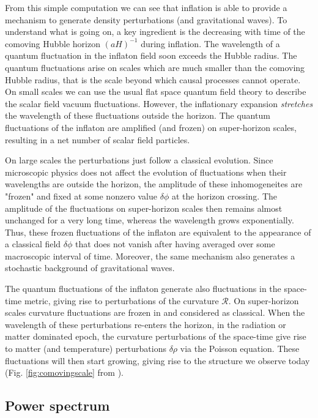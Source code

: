 \documentclass[11pt,a4paper,twoside]{book}
\begin{document}
From this simple computation we can see that inflation is able to provide a mechanism to generate density perturbations (and gravitational waves). To understand what is going on, a key ingredient is the decreasing with time of the comoving Hubble horizon $ (aH)^{-1} $ during inflation. The wavelength of a quantum fluctuation in the inflaton field soon exceeds the Hubble radius. The quantum fluctuations arise on scales which are much smaller than the comoving Hubble radius, that is the scale beyond which causal processes cannot operate. On small scales we can use the usual flat space quantum field theory to describe the scalar field vacuum fluctuations.
However, the inflationary expansion \textit{stretches} the wavelength of these fluctuations  outside the horizon. The quantum fluctuations of the inflaton are amplified (and frozen) on super-horizon scales, resulting in a net number of scalar field particles.

On large scales the perturbations just follow a classical evolution. Since microscopic physics does not affect the evolution of fluctuations when their wavelengths are outside the horizon, the amplitude of these inhomogeneites are "frozen" and fixed at some nonzero value $ \delta\phi $ at the horizon crossing.
The amplitude of the fluctuations on super-horizon scales then remains almost unchanged for a very long time, whereas the wavelength grows exponentially. Thus, these frozen fluctuations of the inflaton are equivalent to the appearance of a classical field $ \delta\phi $ that does not vanish after having averaged over some macroscopic interval of time. Moreover, the same mechanism also generates a stochastic background of gravitational waves.

The quantum fluctuations of the inflaton generate also fluctuations in the space-time metric, giving rise to perturbations of the curvature $ \mathcal{R} $. On super-horizon scales curvature fluctuations are frozen in and considered as classical.
When the wavelength of these perturbations re-enters the horizon, in the radiation or matter dominated epoch, the curvature perturbations of the space-time give rise to matter (and temperature) perturbations $ \delta \rho $ via the Poisson equation.
These fluctuations will then start growing, giving rise to the structure we observe today (Fig. \ref{fig:comovingscale} from \cite{Chap1:ComovingRadiusPlot}).



\subsection{Power spectrum}
\end{document}
